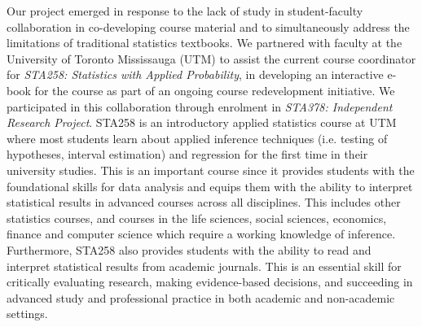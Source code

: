 \documentclass[11pt]{article}
\begin{document}
Our project emerged in response to the lack of study in student-faculty collaboration in co-developing course material and to simultaneously address the limitations of traditional statistics textbooks. 
We partnered with faculty 
at the University of Toronto Mississauga (UTM) to assist the current course coordinator for \textit{STA258: Statistics with Applied Probability}, in developing an interactive e-book for the course as part of an ongoing course redevelopment initiative.
We participated in this collaboration through enrolment in \textit{STA378: Independent Research Project}.
STA258 is an introductory applied statistics course at UTM where most students learn about applied inference techniques (i.e. testing of hypotheses, interval estimation) and regression for the first time in their university studies.
This is an important course since it provides students with the foundational skills for data analysis and equips them with the ability to interpret statistical results in advanced courses across all disciplines.
This includes other statistics courses, and courses in the life sciences, social sciences, economics, finance and computer science which require a working knowledge of inference.
Furthermore, STA258 also provides students with the ability to read and interpret statistical results from academic journals. 
This is an essential skill for critically evaluating research, making evidence-based decisions, and succeeding in advanced study and professional practice in both academic and non-academic settings.
\end{document}
